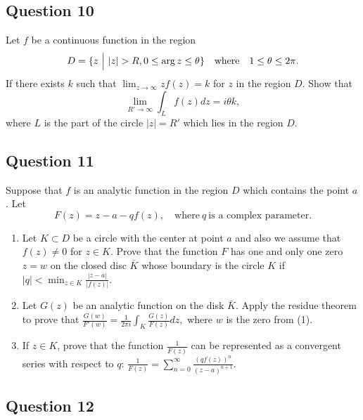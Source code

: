 \documentclass[12pt]{article}
\begin{document}
\hypertarget{question-10-2}{%
\subsection{Question 10}\label{question-10-2}}

Let \(f\) be a continuous function in the region
\[D=\{z {~\mathrel{\Big|}~}  {\left\lvert {z} \right\rvert}>R, 0\leq \arg z\leq \theta\}\quad\text{where}\quad
1\leq \theta \leq 2\pi.\] If there exists \(k\) such that
\(\displaystyle{\lim_{z\to\infty} zf(z)=k}\) for \(z\) in the region
\(D\). Show that \[\lim_{R'\to\infty} \int_{L} f(z) dz=i\theta k,\]
where \(L\) is the part of the circle \(|z|=R'\) which lies in the
region \(D\).

\hypertarget{question-11-2}{%
\subsection{Question 11}\label{question-11-2}}

Suppose that \(f\) is an analytic function in the region \(D\) which
contains the point \(a\). Let
\[F(z)= z-a-qf(z),\quad \text{where}~ q \ \text{is a complex
parameter}.\]

\begin{enumerate}
\def\labelenumi{(\arabic{enumi})}
\item
  Let \(K\subset D\) be a circle with the center at point \(a\) and also
  we assume that \(f(z)\not =0\) for \(z\in K\). Prove that the function
  \(F\) has one and only one zero \(z=w\) on the closed disc \(\bar{K}\)
  whose boundary is the circle \(K\) if
  \(\displaystyle{ |q|<\min_{z\in K} \frac{|z-a|}{|f(z)|}.}\)\\
\item
  Let \(G(z)\) be an analytic function on the disk \(\bar{K}\). Apply
  the residue theorem to prove that
  \(\displaystyle{ \frac{G(w)}{F'(w)}=\frac{1}{2\pi i}\int_K \frac{G(z)}{F(z)} dz,}\)
  where \(w\) is the zero from (1).\\
\item
  If \(z\in K\), prove that the function
  \(\displaystyle{\frac{1}{F(z)}}\) can be represented as a convergent
  series with respect to \(q\):
  \(\displaystyle{ \frac{1}{F(z)}=\sum_{n=0}^{\infty} \frac{(qf(z))^n}{(z-a)^{n+1}}.}\)
\end{enumerate}

\hypertarget{question-12-2}{%
\subsection{Question 12}\label{question-12-2}}
\end{document}
